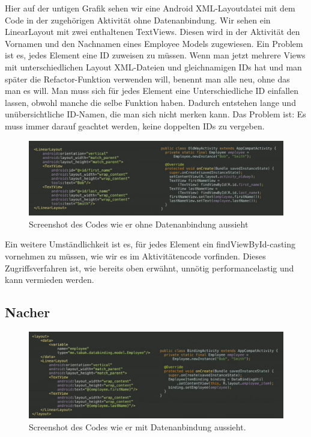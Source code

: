 \documentclass[a4paper,12pt]{article}
\begin{document}
Hier auf der untigen Grafik sehen wir eine Android XML-Layoutdatei mit dem Code in der zugehörigen Aktivität ohne Datenanbindung. Wir sehen ein LinearLayout mit zwei enthaltenen TextViews. Diesen wird in der Aktivität den Vornamen und den Nachnamen eines Employee Models zugewiesen. Ein Problem ist es, jedes Element eine ID zuweisen zu müssen. Wenn man jetzt mehrere Views mit unterschiedlichen Layout XML-Dateien und gleichnamigen IDs hat und man später die Refactor-Funktion verwenden will, benennt man alle neu, ohne das man es will. Man muss sich für jedes Element eine Unterschiedliche ID einfallen lassen, obwohl manche die selbe Funktion haben. Dadurch entstehen lange und unübersichtliche ID-Namen, die man sich nicht merken kann. Das Problem ist: Es muss immer darauf geachtet werden, keine doppelten IDs zu vergeben.\\

\begin{figure}[h]
\centering
\includegraphics[scale=0.45]{Bilder/DataBinding_vorher}
\caption{Screenshot des Codes wie er ohne Datenanbindung aussieht}
\end{figure}

Ein weitere Umständlichkeit ist es, für jedes Element ein findViewById-casting vornehmen zu müssen, wie wir es im Aktivitätencode vorfinden. Dieses Zugriffsverfahren ist, wie bereits oben erwähnt, unnötig performancelastig und kann vermieden werden.
\subsection{Nacher}

\begin{figure}[h]
\centering
\includegraphics[scale=0.45]{Bilder/DataBinding_nacher}
\caption{Screenshot des Codes wie er mit Datenanbindung aussieht.}
\end{figure}
\end{document}
